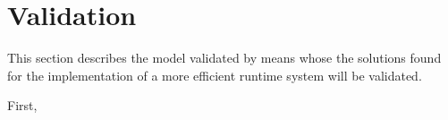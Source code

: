 \section{Validation}
\label{sec:validation}

\noindent 

This section describes the model validated by means whose the solutions found for the implementation of a more efficient runtime system will be validated. 


First, 